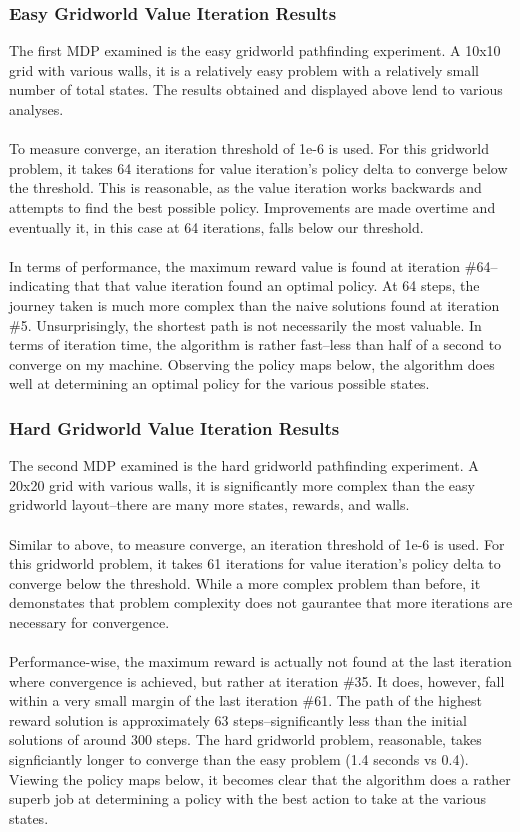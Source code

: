 \documentclass[h]{article}
\begin{document}
 \subsubsection*{Easy Gridworld Value Iteration Results}
 The first MDP examined is the easy gridworld pathfinding experiment.  A 10x10 
 grid with various walls, it is a relatively easy problem with a relatively 
 small number of total states.  The results obtained and displayed above lend to various analyses.
 \\ \\
 To measure converge, an iteration threshold of 1e-6 is used.  For this 
 gridworld problem, it takes 64 iterations for value iteration's policy delta to converge 
 below the threshold.  This is reasonable, as the value iteration works 
 backwards and attempts to find the best possible policy.  Improvements are made 
 overtime and eventually it, in this case at 64 iterations, falls below our 
 threshold.    
 \\ \\
 In terms of performance, the maximum reward value is found at iteration \#64--indicating 
 that that value iteration found an optimal policy.  At 64 steps, the journey 
 taken is much more complex than the naive solutions found at iteration \#5.  
 Unsurprisingly, the shortest path is not necessarily the most valuable.  In 
 terms of iteration time, the algorithm is rather fast--less than half of a 
 second to converge on my machine.  Observing the policy maps below, the algorithm does well at determining an optimal policy for the various possible states. 
 
  \subsubsection*{Hard Gridworld Value Iteration Results}
 The second MDP examined is the hard gridworld pathfinding experiment.  A 20x20 
 grid with various walls, it is significantly more complex than the easy 
 gridworld layout--there are many more states, rewards, and walls.
  \\ \\
 Similar to above, to measure converge, an iteration threshold of 1e-6 is used.  For this 
 gridworld problem, it takes 61 iterations for value iteration's policy delta to converge 
 below the threshold.  While a more complex problem than before, it demonstates that problem complexity does not gaurantee 
 that more iterations are necessary for convergence.
 \\ \\
 Performance-wise, the maximum reward is actually not found at the last 
 iteration where convergence is achieved, but rather at iteration \#35.  It 
 does, however, fall within a very small margin of the last iteration \#61.  
 The path of the highest reward solution is approximately 63 
 steps--significantly less than the initial solutions of around 300 steps.  The 
 hard gridworld problem, reasonable, takes signficiantly longer to converge than 
 the easy problem (1.4 seconds vs 0.4).
 Viewing the policy maps below, it becomes clear that the algorithm does a 
 rather superb job at determining a policy with the best action to take at the various states.
 
\end{document}
